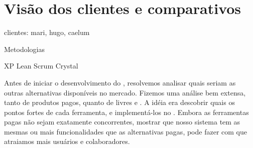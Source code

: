 \section{Visão dos clientes e comparativos}

clientes: mari, hugo, caelum

Metodologias

XP
Lean
Scrum
Crystal


Antes de iniciar o desenvolvimento do \calopsita{}, resolvemos analisar quais seriam as outras alternativas disponíveis no mercado. Fizemos uma análise bem extensa, tanto de produtos pagos, quanto de livres e \opensource{}. A idéia era descobrir quais os pontos fortes de cada ferramenta, e implementá-los no \calopsita{}. Embora as ferramentas pagas não sejam exatamente concorrentes, mostrar que nosso sistema tem as mesmas ou mais funcionalidades que as alternativas pagas, pode fazer com que atraiamos mais usuários e colaboradores.

